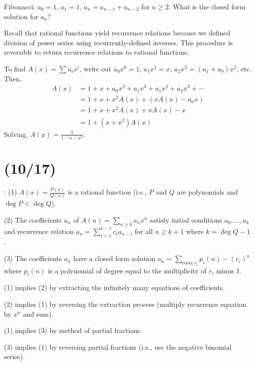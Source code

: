 \begin{example}
  Fibonacci: $a_0 = 1$, $a_1 = 1$, $a_n = a_{n-1} + a_{n-2}$ for $n \geq 2$.
  What is the closed form solution for $a_n$?
\end{example}
\begin{sol}
  Recall that rational functions yield recurrence relations
  because we defined division of power series using recurrently-defined inverses.
  This procedure is reversible to return recurrence relations to rational functions.

  To find $A(x) = \sum a_i x^i$, write out $a_0x^0 = 1$, $a_1x^1 = x$,
  $a_2x^2 = (a_1 + a_0)x^2$, etc. Then,
  \begin{align*}
    A(x) & = 1 + x + a_0x^2 + a_1x^3 + a_1x^2 + a_2x^3 + \dotsb \\
         & = 1 + x + x^2 A(x) + (x A(x) - a_0x)                 \\
         & = 1 + x + x^2 A(x) + x A(x) - x                      \\
         & = 1 + (x+x^2)A(x)
  \end{align*}
  Solving, $A(x) = \frac{1}{1-x-x^2}$.
\end{sol}


\section{(10/17)}

\begin{theorem}[Case 1]\label{thm:main1}
  \TFAE: (1) $A(x) = \frac{P(x)}{Q(x)}$ is a rational function (i.e.,
  $P$ and $Q$ are polynomials and $\deg P < \deg Q$).

  (2) The coefficients $a_n$ of $A(n) = \sum_{n \geq 0} a_n x^n$
  satisfy initial conditions $a_0,\dotsc,a_k$ and recurrence relation
  $a_n = \sum_{i=1}^{k-1} c_i a_{n-i}$ for all $n \geq k+1$ where $k = \deg Q - 1$.

  (3) The coefficients $a_n$ have a closed form solution
  $a_n = \sum_{\text{roots $r_i$}} p_i(n)-(r_i)^n$
  where $p_i(n)$ is a polynomial of degree equal to the multiplicity of $r_i$ minus 1.
\end{theorem}
\begin{prf}
  (1) implies (2) by extracting the infinitely many equations of coefficients.

  (2) implies (1) by reversing the extraction process (multiply recurrence equation by $x^n$ and sum).

  (1) implies (3) by method of partial fractions.

  (3) implies (1) by reversing partial fractions (i.e., use the negative binomial series).
\end{prf}

